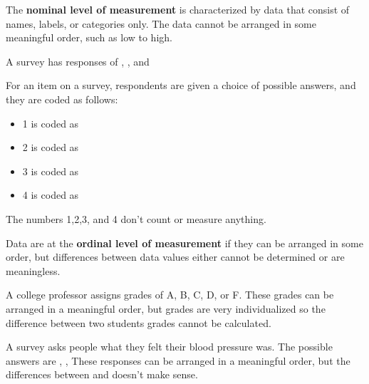 \documentclass{beamer}
\begin{document}
\begin{frame}
\begin{definition}
The \textbf{nominal level of measurement} is characterized by data that consist of names, labels, or categories only. The data cannot be arranged in some meaningful order, such as low to high.
\end{definition}\pause

\begin{example}
A survey has responses of , , and 
\end{example}\pause

\begin{example}
For an item on a survey, respondents are given a choice of possible answers, and they are coded as follows:
\begin{itemize}
\item[] 1 is coded as 
\item[] 2 is coded as 
\item[] 3 is coded as 
\item[] 4 is coded as 
\end{itemize}
The numbers 1,2,3, and 4 don't count or measure anything.
\end{example}
\end{frame}

\begin{frame}
\begin{definition}
Data are at the \textbf{ordinal level of measurement} if they can be arranged in some order, but differences between data values either cannot be determined or are meaningless.
\end{definition}\pause

\begin{example}
A college professor assigns grades of A, B, C, D, or F. These grades can be arranged in a meaningful order, but grades are very individualized so the difference between two students grades cannot be calculated.
\end{example}\pause

\begin{example}
A survey asks people what they felt their blood pressure was. The possible answers are , ,  These responses can be arranged in a meaningful order, but the differences between  and  doesn't make sense.
\end{example}
\end{frame}
\end{document}
